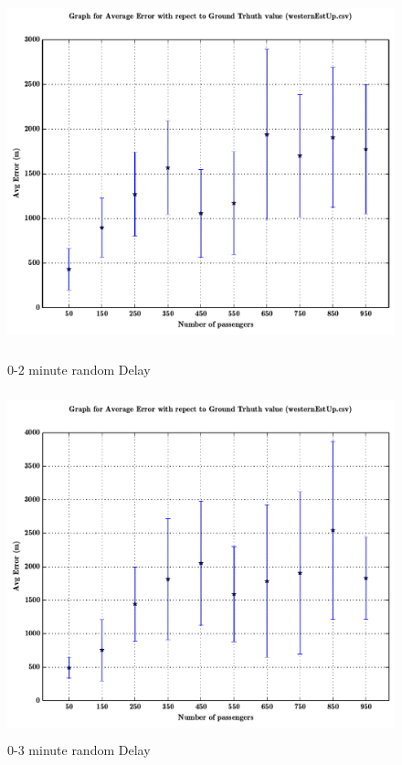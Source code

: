 \documentclass[a4paper,12pt]{report}
\begin{document}
\begin{figure}[h!]

\centering
\includegraphics[height=10cm,width=17cm]{02_2minDelay.pdf}
\caption{0-2 minute random Delay}

\centering
\includegraphics[height=10cm,width=17cm]{03_3minDelay.pdf}
\caption{0-3 minute random Delay}
\end{figure}
\end{document}
